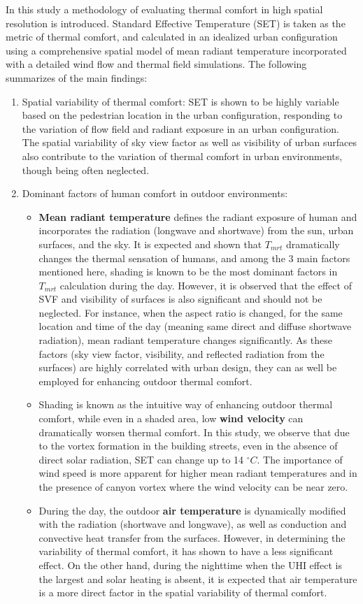 \documentclass[smallextended]{svjour3}
\newcommand{\degree}{\ensuremath{^\circ}}
\begin{document}
In this study a methodology of evaluating thermal comfort in high spatial resolution is introduced. Standard Effective Temperature (SET) is taken as the metric of thermal comfort, and calculated in an idealized urban configuration using a comprehensive spatial model of mean radiant temperature incorporated with a detailed wind flow and thermal field simulations.  The following summarizes of the main findings:
\begin{enumerate}
    \item 	Spatial variability of thermal comfort: SET is shown to be highly variable based on the pedestrian location in the urban configuration, responding to the variation of flow field and radiant exposure in an urban configuration. 
    The spatial variability of sky view factor as well as visibility of urban surfaces also contribute to the variation of thermal comfort in urban environments, though being often neglected. 
    \item 	Dominant factors of human comfort in outdoor environments: 
\begin{itemize}
\item \textbf{Mean radiant temperature} defines the radiant exposure of human and incorporates the radiation (longwave and shortwave) from the sun, urban surfaces, and the sky. 
It is expected and shown that $T_{mrt}$ dramatically changes the thermal sensation of humans, and among the 3 main factors mentioned here, shading is known to be the most dominant factors in $T_{mrt}$ calculation during the day. However, it is observed that the effect of SVF and visibility of surfaces is also significant and should not be neglected. For instance, when the aspect ratio is changed, for the same location and time of the day (meaning same direct and diffuse shortwave radiation), mean radiant temperature changes significantly. As these factors (sky view factor, visibility, and reflected radiation from the surfaces) are highly correlated with urban design, they can as well be employed for enhancing outdoor thermal comfort. 
\item Shading is known as the intuitive way of enhancing outdoor thermal comfort, while even in a shaded area, low \textbf{wind velocity} can dramatically worsen thermal comfort. In this study, we observe that due to the vortex formation in the building streets, even in the absence of direct solar radiation, SET can change up to 14 $\degree C$. The importance of wind speed is more apparent for higher mean radiant temperatures and in the presence of canyon vortex where the wind velocity can be near zero. 
\item 	During the day, the outdoor \textbf{air temperature} is dynamically modified with the radiation (shortwave and longwave), as well as conduction and convective heat transfer from the surfaces. However, in determining the variability of thermal comfort, it has shown to have a less significant effect.  On the other hand, during the nighttime when the UHI effect is the largest and solar heating is absent, it is expected that air temperature is a more direct factor in the spatial variability of thermal comfort.
\end{itemize}
\end{enumerate}
\end{document}

